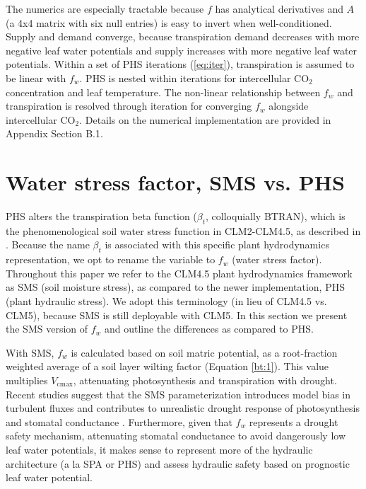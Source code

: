 \documentclass[draft,linenumbers]{agujournal}
\begin{document}
    The numerics are especially tractable because $f$ has analytical derivatives and $A$ 
    (a 4x4 matrix with six null entries) is easy to invert when well-conditioned. 
    Supply and demand converge, because transpiration demand decreases with more negative 
    leaf water potentials and supply increases with more negative leaf water potentials.
    Within a set of PHS iterations (\ref{eq:iter}), transpiration is assumed to be linear with $f_w$.
    PHS is nested within iterations for intercellular CO$_2$ concentration and leaf temperature.
    The non-linear relationship between $f_w$ and transpiration is resolved through iteration for converging $f_w$ alongside intercellular CO$_2$.
    Details on the numerical implementation are provided in Appendix Section B.1.


\section{Water stress factor, SMS vs. PHS}
\label{sect:btran}
    PHS alters the transpiration beta function ($\beta_t$, colloquially BTRAN), 
    which is the phenomenological soil water stress function in CLM2-CLM4.5, as described in \citet{oleson2013}.
    Because the name $\beta_t$ is associated with this specific plant hydrodynamics representation, we opt to rename the variable to $f_w$ (water stress factor).
    Throughout this paper we refer to the CLM4.5 plant hydrodynamics framework as SMS (soil moisture stress), 
    as compared to the newer implementation, PHS (plant hydraulic stress).
    We adopt this terminology (in lieu of CLM4.5 vs. CLM5), because SMS is still deployable with CLM5. 
    In this section we present the SMS version of $f_w$ and outline the differences as compared to PHS.
    
    With SMS, $f_w$ is calculated based on soil matric potential, as a root-fraction weighted average of a soil layer wilting factor (Equation \ref{bt:1}).
    This value multiplies $V_{\text{cmax}}$, attenuating photosynthesis and transpiration with drought.
    Recent studies suggest that the SMS parameterization introduces model bias in turbulent fluxes \citep{bonan2014}
    and contributes to unrealistic drought response of photosynthesis and stomatal conductance \citep{powell2013}.
    Furthermore, given that $f_w$ represents a drought safety mechanism, attenuating stomatal conductance to avoid
    dangerously low leaf water potentials, it makes sense to represent more of the hydraulic architecture (a la SPA or PHS)
    and assess hydraulic safety based on prognostic leaf water potential.
    
\end{document}
